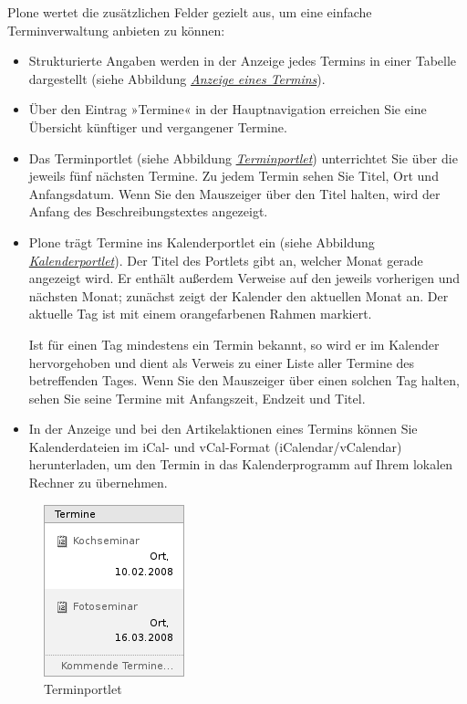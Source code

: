 \documentclass[a4paper,12pt,ngerman]{manual}
\begin{document}
Plone wertet die zusätzlichen Felder gezielt aus, um eine einfache
Terminverwaltung anbieten zu können:
\begin{itemize}
\item {} 
Strukturierte Angaben werden in der Anzeige jedes Termins in einer
Tabelle dargestellt (siehe Abbildung \hyperlink{fig-termin}{\emph{Anzeige eines Termins}}).

\item {} 
Über den Eintrag »Termine« in der Hauptnavigation erreichen Sie eine
Übersicht künftiger und vergangener Termine.

\item {} 
Das Terminportlet (siehe Abbildung \hyperlink{fig-portlet-events}{\emph{Terminportlet}})
unterrichtet Sie über die jeweils fünf nächsten Termine. Zu
jedem Termin sehen Sie Titel, Ort und Anfangsdatum. Wenn Sie den Mauszeiger
über den Titel halten, wird der Anfang des Beschreibungstextes angezeigt.

\item {} 
Plone trägt Termine ins Kalenderportlet ein (siehe
Abbildung \hyperlink{fig-portlet-calendar}{\emph{Kalenderportlet}}).
Der Titel des Portlets gibt an, welcher Monat gerade angezeigt wird. Er
enthält außerdem Verweise auf den jeweils vorherigen und nächsten Monat;
zunächst zeigt der Kalender den aktuellen Monat an. Der aktuelle Tag ist mit
einem orangefarbenen Rahmen markiert.

Ist für einen Tag mindestens ein Termin bekannt, so wird er im Kalender
hervorgehoben und dient als Verweis zu einer Liste aller Termine des
betreffenden Tages. Wenn Sie den Mauszeiger über einen solchen Tag halten,
sehen Sie seine Termine mit Anfangszeit, Endzeit und Titel.

\item {} 
In der Anzeige und bei den Artikelaktionen eines Termins können Sie
Kalenderdateien im iCal- und vCal-Format (iCalendar/vCalendar)
herunterladen, um den Termin in das Kalenderprogramm auf Ihrem lokalen
Rechner zu übernehmen.

\end{itemize}
\hypertarget{fig-portlet-events}{}\begin{figure}[htbp]
\centering

\includegraphics{portlet-events.png}
\caption{Terminportlet}\end{figure}
\end{document}
